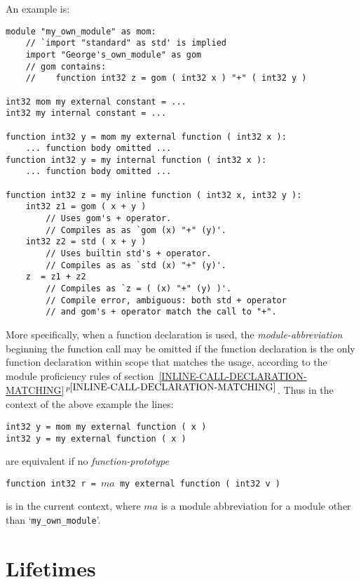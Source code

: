 \documentclass[12pt]{article}
\newcommand{\itemref}[1]{\ref{#1}$\,^{p\pageref{#1}}$}
\newenvironment{indpar}[1][0.3in]%
	{\begin{list}{}%
		     {\setlength{\itemsep}{0in}%
		      \setlength{\topsep}{0in}%
		      \setlength{\parsep}{1ex}%
		      \setlength{\labelwidth}{#1}%
		      \setlength{\leftmargin}{#1}%
		      \addtolength{\leftmargin}{\labelsep}}%
	 \item}%
	{\end{list}}
\begin{document}
An example is:
\begin{indpar}\begin{verbatim}
module "my_own_module" as mom:
    // `import "standard" as std' is implied
    import "George's_own_module" as gom
    // gom contains:
    //    function int32 z = gom ( int32 x ) "+" ( int32 y )

int32 mom my external constant = ...
int32 my internal constant = ...

function int32 y = mom my external function ( int32 x ):
    ... function body omitted ...
function int32 y = my internal function ( int32 x ):
    ... function body omitted ...

function int32 z = my inline function ( int32 x, int32 y ):
    int32 z1 = gom ( x + y )
        // Uses gom's + operator.
        // Compiles as as `gom (x) "+" (y)'.
    int32 z2 = std ( x + y )
        // Uses builtin std's + operator.
        // Compiles as as `std (x) "+" (y)'.
    z  = z1 + z2 
        // Compiles as `z = ( (x) "+" (y) )'.
        // Compile error, ambiguous: both std + operator
        // and gom's + operator match the call to "+".
\end{verbatim}\end{indpar}\label{EXTERNAL-INTERNAL-EXAMPLE}

More specifically,
when a function declaration is used, the {\em module-abbreviation}
beginning the function call may be omitted if the function declaration is
the only function declaration within scope that matches the usage,
according to the module proficiency rules of
section~\itemref{INLINE-CALL-DECLARATION-MATCHING}.
Thus in the context of the above example the lines:
\begin{indpar}\begin{verbatim}
int32 y = mom my external function ( x )
int32 y = my external function ( x )
\end{verbatim}\end{indpar}
are equivalent if no {\em function-prototype}
\begin{center}
\tt function int32 r = $ma$ my external function ( int32 v )
\end{center}
is in the current context, where $ma$ is a module abbreviation for a module
other than `{\tt my\_own\_module}'.

\section{Lifetimes}
\label{LIFETIMES}
\end{document}

